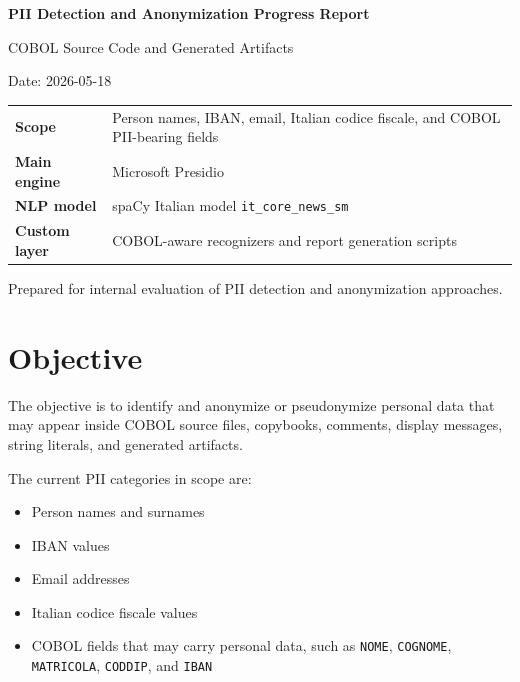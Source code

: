 ﻿\documentclass[11pt,a4paper]{article}
\newcommand{\code}[1]{\texttt{#1}}
\begin{document}
\begin{titlepage}
  \centering
  \vspace*{2.2cm}
  {\Huge\bfseries\color{Primary} PII Detection and Anonymization Progress Report\par}
  \vspace{0.6cm}
  {\Large COBOL Source Code and Generated Artifacts\par}
  \vspace{1.2cm}
  {\large Date: 2026-05-18\par}
  \vfill
  \begin{tabular}{>{\bfseries}p{}p{}}
    Scope & Person names, IBAN, email, Italian codice fiscale, and COBOL PII-bearing fields \\
    Main engine & Microsoft Presidio \\
    NLP model & spaCy Italian model \code{it\_core\_news\_sm} \\
    Custom layer & COBOL-aware recognizers and report generation scripts \\
  \end{tabular}
  \vfill
  {\small\textcolor{Muted}{Prepared for internal evaluation of PII detection and anonymization approaches.}\par}
\end{titlepage}

\tableofcontents
\newpage

\section{Objective}

The objective is to identify and anonymize or pseudonymize personal data that may appear inside COBOL source files, copybooks, comments, display messages, string literals, and generated artifacts.

The current PII categories in scope are:

\begin{itemize}
  \item Person names and surnames
  \item IBAN values
  \item Email addresses
  \item Italian codice fiscale values
  \item COBOL fields that may carry personal data, such as \code{NOME}, \code{COGNOME}, \code{MATRICOLA}, \code{CODDIP}, and \code{IBAN}
\end{itemize}
\end{document}
